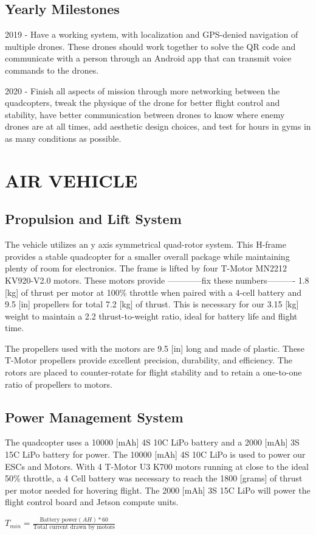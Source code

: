 \documentclass[12pt,letterpaper]{article}
\begin{document}
	\pagebreak
	\subsection*{Yearly Milestones}

	2019 - Have a working system, with localization and GPS-denied navigation of multiple drones. These drones should work together to solve the QR code and communicate with a person through an Android app that can transmit voice commands to the drones.

	2020 - Finish all aspects of mission through more networking between the quadcopters, tweak the physique of the drone for better flight control and stability, have better communication between drones to know where enemy drones are at all times, add aesthetic design choices, and test for hours in gyms in as many conditions as possible. 


\section*{AIR VEHICLE}
	\subsection*{Propulsion and Lift System}
			The vehicle utilizes an y axis symmetrical quad-rotor system. This H-frame provides a stable quadcopter for a smaller overall package while maintaining plenty of room for electronics. The frame is lifted by four T-Motor MN2212 KV920-V2.0 motors. These motors provide
			------------fix these numbers---------- 1.8 [kg] of thrust per motor at 100\% throttle when paired with a 4-cell battery and 9.5 [in] propellers for total 7.2 [kg] of thrust. This is necessary for our 3.15 [kg] weight to maintain a 2.2 thrust-to-weight ratio, ideal for battery life and flight time.

			The propellers used with the motors are 9.5 [in] long and made of plastic. These T-Motor propellers provide excellent precision, durability, and efficiency. The rotors are placed to counter-rotate for flight stability and to retain a one-to-one ratio of propellers to motors.
	\subsection*{Power Management System}
The quadcopter uses a 10000 [mAh] 4S 10C LiPo battery and a 2000 [mAh] 3S 15C LiPo battery for power. The 10000 [mAh] 4S 10C LiPo is used to power our ESCs and Motors. With 4 T-Motor U3 K700 motors running at close to the ideal 50\% throttle, a 4 Cell battery was necessary to reach the 1800 [grams] of thrust per motor needed for hovering flight. The 2000 [mAh] 3S 15C LiPo will power the flight control board and Jetson compute units.
\begin{center}
	$T_{min} = \frac{\text{Battery power}(AH) * 60}{\text{Total current drawn by motors}}$
\end{center}
\end{document}
